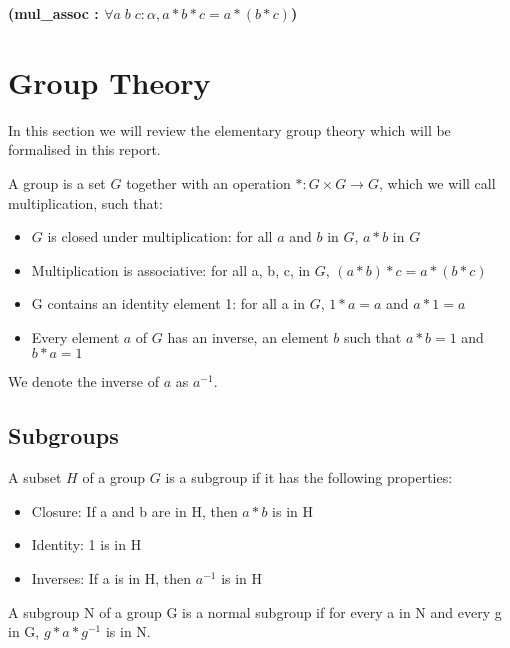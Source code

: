 \documentclass[runningheads,a4paper]{llncs}
\renewcommand{\a}{\alpha}
\renewcommand{\-}{\setminus}
\begin{document}
\hspace{6 em}\textbf{(mul\_assoc : $\forall a\; b\; c : \a, a * b * c = a * (b * c)$)}
\vspace{2 mm}


\section{Group Theory}

In this section we will review the elementary group theory\cite{artin} which will be formalised in this report.

\begin{definition}[Group] 
A group is a set $G$ together with an operation $* : G \times G \to G$, which we will call multiplication, such that:
\begin{itemize}
\item $G$ is closed under multiplication: for all $a$ and $b$ in $G$, $a*b$ in $G$
\item Multiplication is associative: for all a, b, c, in $G$, $(a*b)*c = a*(b*c)$
\item G contains an identity element 1: for all a in $G$, $1*a = a$ and $a*1=a$
\item Every element $a$ of $G$ has an inverse, an element $b$ such that $a*b = 1$ and $b*a =1$
\end{itemize}

We denote the inverse of $a$ as $a^{-1}$.
\end{definition}

\subsection{Subgroups}

\begin{definition}[Subgroup]
A subset $H$ of a group $G$ is a subgroup if it has the following properties:
\begin{itemize}
\item Closure: If a and b are in H, then $a * b$ is in H
\item Identity: 1 is in H
\item Inverses: If a is in H, then $a^{-1}$ is in H
\end{itemize}
\end{definition}

\begin{definition}[Normal]
A subgroup N of a group G is a normal subgroup if for every a in N and every g in G, $g * a * g^{-1}$ is in N.
\end{definition}
\end{document}

